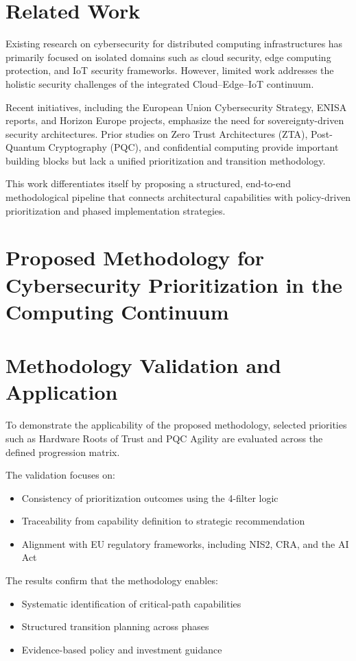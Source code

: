 \documentclass{ieeeaccess}
\begin{document}
 
\section{Related Work}

Existing research on cybersecurity for distributed computing infrastructures has primarily focused on isolated domains such as cloud security, edge computing protection, and IoT security frameworks. However, limited work addresses the holistic security challenges of the integrated Cloud--Edge--IoT continuum.

Recent initiatives, including the European Union Cybersecurity Strategy, ENISA reports, and Horizon Europe projects, emphasize the need for sovereignty-driven security architectures. Prior studies on Zero Trust Architectures (ZTA), Post-Quantum Cryptography (PQC), and confidential computing provide important building blocks but lack a unified prioritization and transition methodology.

This work differentiates itself by proposing a structured, end-to-end methodological pipeline that connects architectural capabilities with policy-driven prioritization and phased implementation strategies.

\section{Proposed Methodology for Cybersecurity Prioritization in the Computing Continuum}
\section{Methodology Validation and Application}

To demonstrate the applicability of the proposed methodology, selected priorities such as Hardware Roots of Trust and PQC Agility are evaluated across the defined progression matrix.

The validation focuses on:
\begin{itemize}
    \item Consistency of prioritization outcomes using the 4-filter logic
    \item Traceability from capability definition to strategic recommendation
    \item Alignment with EU regulatory frameworks, including NIS2, CRA, and the AI Act
\end{itemize}

The results confirm that the methodology enables:
\begin{itemize}
    \item Systematic identification of critical-path capabilities
    \item Structured transition planning across phases
    \item Evidence-based policy and investment guidance
\end{itemize}
\end{document}
